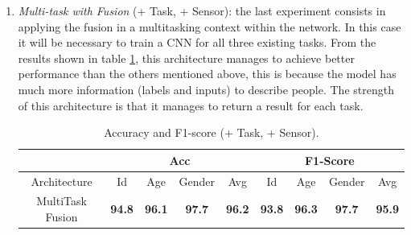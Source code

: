 \begin{enumerate}
    \item \emph{Multi-task with Fusion} (+ Task, + Sensor): the last experiment consists in applying the fusion in a multitasking context within the network. In this case it will be necessary to train a CNN for all three existing tasks. From the results shown in table \ref{table accuracy and F1 (+ Task, + Sensor)}, this architecture manages to achieve better performance than the others mentioned above, this is because the model has much more information (labels and inputs) to describe people. The strength of this architecture is that it manages to return a result for each task.
    \begin{table}[h!]
        \centering
        \begin{adjustbox}{max width=\textwidth}
        \begin{tabular}{|c||ccc|c||ccc|c|}
            \hline
                & \multicolumn{4}{c||}{Acc} & \multicolumn{4}{c|}{F1-Score} \\
            \hline
                Architecture & Id & Age & Gender & Avg & Id & Age & Gender & Avg\\
            \hline
                MultiTask Fusion & \bfseries{94.8} & \bfseries{96.1} & \bfseries{97.7} & \bfseries{96.2} & \bfseries{93.8} & \bfseries{96.3} & \bfseries{97.7} & \bfseries{95.9}\\
            \hline 
        \end{tabular}
        \end{adjustbox}
        \caption{Accuracy and F1-score (+ Task, + Sensor).}
        \label{table accuracy and F1 (+ Task, + Sensor)}
    \end{table}
\end{enumerate}

